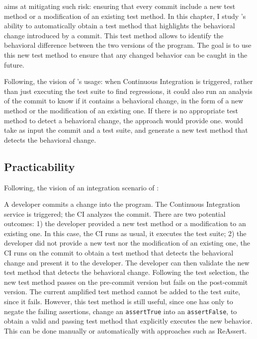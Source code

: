 \DCI aims at mitigating such risk: 
ensuring that every commit include a new test method or a modification of an existing test method.
In this chapter, I study \dspot's ability to automatically obtain a test method that highlights the behavioral change introduced by a commit.
This test method allows to identify the behavioral difference between the two versions of the program. 
The goal is to use this new test method to ensure that any changed behavior can be caught in the future.

Following, the vision of \DCI's usage:
when Continuous Integration is triggered, 
rather than just executing the test suite to find regressions, 
it could also run an analysis of the commit to know if it contains a behavioral change, 
in the form of a new method or the modification of an existing one.
If there is no appropriate test method to detect a behavioral change, the approach would provide one. 
\DCI would take as input the commit and a test suite, and generate a new test method that detects the behavioral change.

\subsection{Practicability}
\label{subsec:dci:background:practicability}

Following, the vision of an integration scenario of \DCI:

A developer commits a change into the program.
The Continuous Integration service is triggered;
the CI analyzes the commit.
There are two potential outcomes:
1) the developer provided a new test method or a modification to an existing one. 
In this case, the CI runs as usual, \eg it executes the test suite;
2) the developer did not provide a new test nor the modification of an existing one, the CI runs \DCI on the commit to obtain a test method that detects the behavioral change and present it to the developer.
The developer can then validate the new test method that detects the behavioral change.
Following the test selection, the new test method passes on the pre-commit version but fails on the post-commit version.
The current amplified test method cannot be added to the test suite, since it fails.
However, this test method is still useful, since one has only to negate the failing assertions, \eg change an \texttt{assertTrue} into an \texttt{assertFalse}, to obtain a valid and passing test method that explicitly executes the new behavior.
This can be done manually or automatically with approaches such as ReAssert\cite{ReAssert}.

